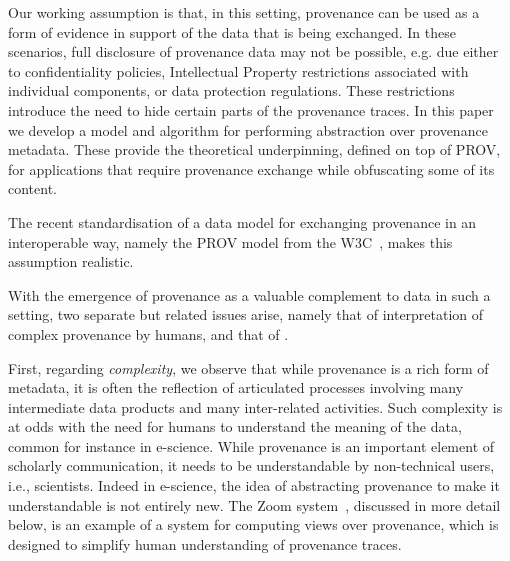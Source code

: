 
%
%
%
Our working assumption is that, in this setting, provenance can be used as a form of evidence in support of the data that is being exchanged. 
%
In these scenarios, full disclosure of provenance data may not be possible, e.g. due either to confidentiality policies, Intellectual Property restrictions associated with individual components, or data protection regulations. These restrictions introduce the need to hide certain parts of the provenance traces. 
%
In this paper we develop a model and algorithm for performing  abstraction over provenance metadata. These provide the theoretical underpinning, defined on top of PROV, for applications that require provenance exchange while obfuscating some of its content.


The recent standardisation of a data model for exchanging provenance in an interoperable way, namely the PROV model from the W3C~\citep{w3c-prov-dm}, makes this assumption realistic.
%



With the emergence of provenance as a valuable complement to data in such a setting, two separate but related issues arise, namely that of interpretation of complex provenance by humans,  and that of .
  
%
First, regarding \textit{complexity}, we observe that while provenance is a rich form of metadata, it is often the reflection of articulated processes involving many intermediate data products and many inter-related activities. 
%
Such complexity is at odds with the need for humans to understand the meaning of the data, common for instance in e-science. 
While provenance is an important element of scholarly communication, it needs to be understandable by non-technical users, i.e., scientists. 
%
Indeed in e-science, the idea of abstracting provenance to make it understandable is not entirely new.
%
The Zoom system~\citep{DBLP:conf/icde/BitonBDH08}, discussed in more detail below, is an example of a system for computing views over provenance, which is designed to simplify human understanding of provenance traces.
%



